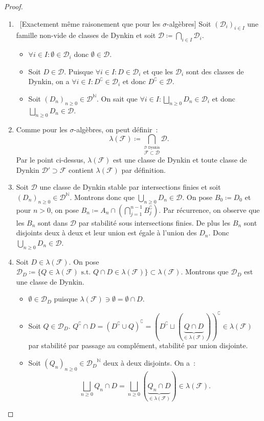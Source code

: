 \documentclass{article}
\theoremstyle{definition}
\newcommand{\st}{\text{ s.t. }}
\newcommand{\C}{\complement}
\newcommand{\N}{{\mathbb N}}
\begin{document}
\begin{proof}~
\begin{enumerate}
	\item~[Exactement même raisonement que pour les $\sigma$-algèbres] Soit $(\mathcal D_i)_{i \in I}$ une famille non-vide de classes de Dynkin et soit
	$\mathcal D \coloneqq \bigcap_{i \in I}\mathcal D_i$.

	\begin{itemize}
		\item $\forall i \in I : \emptyset \in \mathcal D_i$ donc $\emptyset \in \mathcal D$.
		\item Soit $D \in \mathcal D$. Puisque $\forall i \in I : D \in \mathcal D_i$ et que les $\mathcal D_i$ sont des classes de Dynkin, on a $\forall i \in I : D^\C \in \mathcal D_i$
		et donc $D^\C \in \mathcal D$.
		\item Soit $(D_n)_{n \geq 0} \in \mathcal D^\N$. On sait que $\forall i \in I : \bigsqcup_{n \geq 0}D_n \in \mathcal D_i$ et donc $\bigsqcup_{n \geq 0}D_n \in \mathcal D$.
	\end{itemize}

	\item Comme pour les $\sigma$-algèbres, on peut définir~:
	\[\lambda(\mathcal F) \coloneqq \bigcap_{\overset{\mathcal D \text{ Dynkin}}{\mathcal F \subset \mathcal D}}\mathcal D.\]
	Par le point ci-dessus, $\lambda(\mathcal F)$ est une classe de Dynkin et toute classe de Dynkin $\mathcal D' \supset \mathcal F$ contient $\lambda(\mathcal F)$ par définition.

	\item Soit $\mathcal D$ une classe de Dynkin stable par intersections finies et soit $(D_n)_{n \geq 0} \in \mathcal D^\N$. Montrons donc que $\bigcup_{n \geq 0}D_n \in \mathcal D$.
	On pose $B_0 \coloneqq D_0$ et pour $n > 0$, on pose $B_n \coloneqq A_n \cap (\bigcap_{j=1}^{n-1}B_j^\C)$. Par récurrence, on observe que les $B_n$ sont dans $\mathcal D$ par
	stabilité sous intersections finies. De plus les $B_n$ sont disjoints deux à deux et leur union est égale à l'union des $D_n$. Donc $\bigcup_{n \geq 0}D_n \in \mathcal D$.

	\item Soit $D \in \lambda(\mathcal F)$. On pose $\mathcal D_D \coloneqq \{Q \in \lambda(\mathcal F) \st Q \cap D \in \lambda(\mathcal F)\} \subset \lambda(\mathcal F)$.
	Montrons que $\mathcal D_D$ est une classe de Dynkin.
	\begin{itemize}
		\item $\emptyset \in \mathcal D_D$ puisque $\lambda(\mathcal F) \ni \emptyset = \emptyset \cap D$.
		\item Soit $Q \in \mathcal D_D$. $Q^\C \cap D = (D^\C \cup Q)^\C = (D^\C \sqcup (\underbrace {Q \cap D}_{\in \lambda(\mathcal F)}))^\C \in \lambda(\mathcal F)$ par
		stabilité par passage au complément, stabilité par union disjointe.
		\item Soit $(Q_n)_{n \geq 0} \in {\mathcal D_D}^\N$ deux à deux disjoints. On a~:
		\[\bigsqcup_{n \geq 0}Q_n \cap D = \bigsqcup_{n \geq 0}(\underbrace {Q_n \cap D}_{\in \lambda(\mathcal F)}) \in \lambda(\mathcal F).\]
	\end{itemize}


\end{enumerate}
\end{proof}
\end{document}
